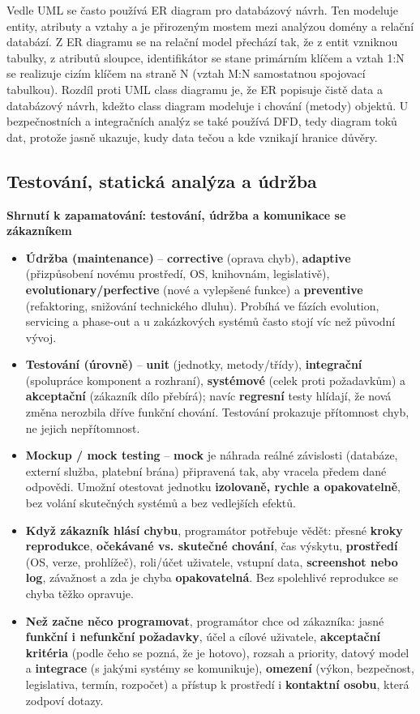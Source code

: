 Vedle UML se často používá ER diagram pro databázový návrh. Ten modeluje entity, atributy a vztahy a je přirozeným mostem mezi analýzou domény a relační databází. Z ER diagramu se na relační model přechází tak, že z entit vzniknou tabulky, z atributů sloupce, identifikátor se stane primárním klíčem a vztah 1:N se realizuje cizím klíčem na straně N (vztah M:N samostatnou spojovací tabulkou). Rozdíl proti UML class diagramu je, že ER popisuje čistě data a databázový návrh, kdežto class diagram modeluje i chování (metody) objektů. U bezpečnostních a integračních analýz se také používá DFD, tedy diagram toků dat, protože jasně ukazuje, kudy data tečou a kde vznikají hranice důvěry.

\subsection*{Testování, statická analýza a údržba}

\begin{notebox}
\textbf{Shrnutí k zapamatování: testování, údržba a komunikace se zákazníkem}
\begin{itemize}
  \item \textbf{Údržba (maintenance)} -- \textbf{corrective} (oprava chyb), \textbf{adaptive} (přizpůsobení novému prostředí, OS, knihovnám, legislativě), \textbf{evolutionary/perfective} (nové a vylepšené funkce) a \textbf{preventive} (refaktoring, snižování technického dluhu). Probíhá ve fázích evolution, servicing a phase-out a u zakázkových systémů často stojí víc než původní vývoj.
  \item \textbf{Testování (úrovně)} -- \textbf{unit} (jednotky, metody/třídy), \textbf{integrační} (spolupráce komponent a rozhraní), \textbf{systémové} (celek proti požadavkům) a \textbf{akceptační} (zákazník dílo přebírá); navíc \textbf{regresní} testy hlídají, že nová změna nerozbila dříve funkční chování. Testování prokazuje přítomnost chyb, ne jejich nepřítomnost.
  \item \textbf{Mockup / mock testing} -- \textbf{mock} je náhrada reálné závislosti (databáze, externí služba, platební brána) připravená tak, aby vracela předem dané odpovědi. Umožní otestovat jednotku \textbf{izolovaně, rychle a opakovatelně}, bez volání skutečných systémů a bez vedlejších efektů.
  \item \textbf{Když zákazník hlásí chybu}, programátor potřebuje vědět: přesné \textbf{kroky reprodukce}, \textbf{očekávané vs. skutečné chování}, čas výskytu, \textbf{prostředí} (OS, verze, prohlížeč), roli/účet uživatele, vstupní data, \textbf{screenshot nebo log}, závažnost a zda je chyba \textbf{opakovatelná}. Bez spolehlivé reprodukce se chyba těžko opravuje.
  \item \textbf{Než začne něco programovat}, programátor chce od zákazníka: jasné \textbf{funkční i nefunkční požadavky}, účel a cílové uživatele, \textbf{akceptační kritéria} (podle čeho se pozná, že je hotovo), rozsah a priority, datový model a \textbf{integrace} (s jakými systémy se komunikuje), \textbf{omezení} (výkon, bezpečnost, legislativa, termín, rozpočet) a přístup k prostředí i \textbf{kontaktní osobu}, která zodpoví dotazy.
\end{itemize}
\end{notebox}

